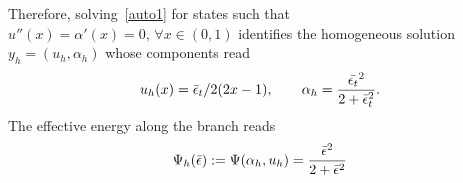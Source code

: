 Therefore, solving~\eqref{auto1} for states such that $u''(x)=\alpha'(x)= 0, \, \forall x\in (0, 1)$ identifies the homogeneous solution $y_h = (u_h, \alpha_h)$ whose components read 
\begin{equation}
u_h(x) =  \bar \epsilon_t/2 (2x-1),\qquad\alpha_h = \frac{\Bar{\epsilon_t}^2}{2 + \Bar\epsilon_t^2}\label{eq:homo1}.
\end{equation}
The effective  energy along the  branch reads  
\begin{equation}
    \label{eq:energy_homogeneous}
    \Psi_h(\bar\epsilon) :=\Psi(\alpha_h, u_h) = \frac{\Bar{\epsilon}^2}{2 + \Bar\epsilon^2}
\end{equation}


